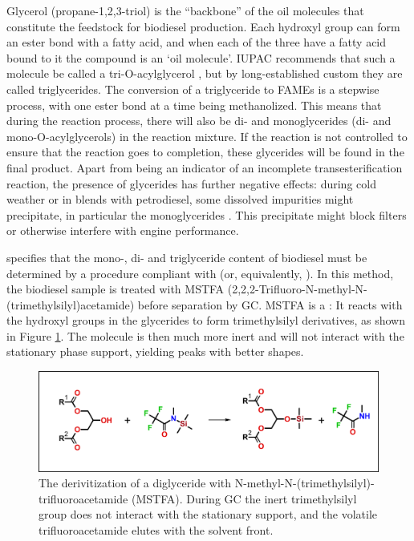 Glycerol (propane-1,2,3-triol) is the ``backbone'' of the oil molecules that
constitute the feedstock for biodiesel production. Each hydroxyl group can form
an ester bond with a fatty acid, and when each of the three have a fatty acid
bound to it the compound is an `oil molecule'. IUPAC recommends that such a
molecule be called a tri-O-acylglycerol \autocite{Nic2009}, but by
long-established custom they are called triglycerides. The conversion of a
triglyceride to FAMEs is a stepwise process, with one ester bond at a time being
methanolized. This means that during the reaction process, there will also be
di- and monoglycerides (di- and mono-O-acylglycerols) in the reaction mixture.
If the reaction is not controlled to ensure that the reaction goes to
completion, these glycerides will be found in the final product. Apart from
being an indicator of an incomplete transesterification reaction, the presence
of glycerides has further negative effects: during cold weather or in blends
with petrodiesel, some dissolved impurities might precipitate, in particular the
monoglycerides \autocite{Dunn2009,Plata2015}. This precipitate might block
filters or otherwise interfere with engine performance.

 specifies that the mono-, di- and triglyceride content of
biodiesel must be determined by a procedure compliant with  (or,
equivalently, ). In this method, the biodiesel sample is treated
with MSTFA (2,2,2-Tri\-fluoro-N-methyl-N-(trimethylsilyl)acetamide) before
separation by GC. MSTFA is a : It reacts with
the hydroxyl groups in the glycerides to form trimethylsilyl derivatives, as
shown in Figure \ref{fig:MSTFA}. The molecule is then much more inert and will
not interact with the stationary phase support, yielding peaks with better
shapes.

\begin{figure}
\centering
\includegraphics[width=\textwidth]{Figures/Derivatization.pdf}
\decoRule

\caption[Derivitization]{The derivitization of a diglyceride with
N-methyl-N-(trimethylsilyl)-trifluoroacetamide (MSTFA). During GC the inert
trimethylsilyl group does not interact with the stationary support,
and the volatile trifluoroacetamide elutes with the solvent front.}

\label{fig:MSTFA}
\end{figure}

